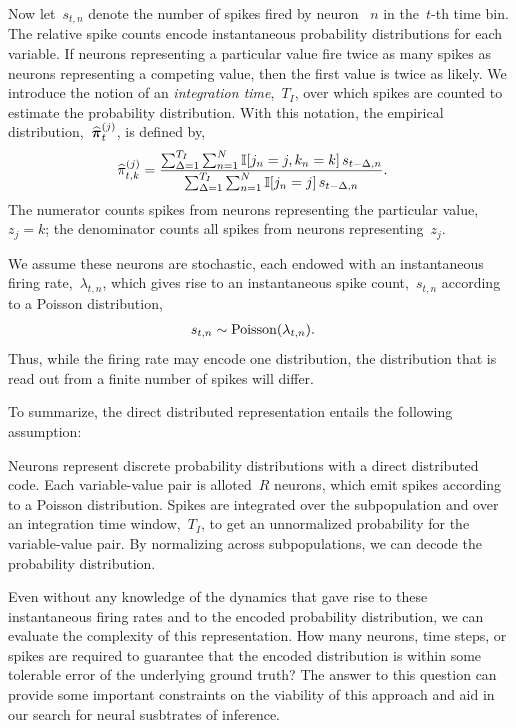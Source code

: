 Now let~$s_{t,n}$ denote the number of spikes fired by neuron ~$n$ in
the~$t$-th time bin. The relative spike counts encode instantaneous
probability distributions for each variable.  If neurons representing
a particular value fire twice as many spikes as neurons representing a
competing value, then the first value is twice as likely. We introduce
the notion of an \emph{integration time},~$T_I$, over which spikes are
counted to estimate the probability distribution. With this notation,
the empirical distribution,~$\widehat{\boldsymbol{\pi}}_t^{(j)}$, is defined by,
\begin{align}
  \widehat{\pi}_{t,k}^{(j)} &=
  \frac{\sum_{\Delta = 1}^{T_I} \sum_{n=1}^N \mathbb{I}[j_n=j, k_n=k] \, s_{t-\Delta,n}}
       {\sum_{\Delta = 1}^{T_I} \sum_{n=1}^N \mathbb{I}[j_n=j] \, s_{t-\Delta,n}}.
\end{align}
The numerator counts spikes from neurons representing the particular value,~$z_j=k$;
the denominator counts all spikes from neurons representing~$z_j$.


We assume these neurons are stochastic, each endowed
with an instantaneous firing rate,~$\lambda_{t,n}$, which gives rise to an
instantaneous spike count,~$s_{t,n}$ according to a Poisson distribution,
\begin{align}
s_{t,n} &\sim \mathrm{Poisson}(\lambda_{t,n}).
\end{align}
Thus, while the firing rate may encode one distribution, the distribution
that is read out from a finite number of spikes will differ. 

To summarize, the direct distributed representation entails the following
assumption:

\begin{assumption}
  Neurons represent discrete probability distributions with a direct
  distributed code. Each variable-value pair is alloted~$R$ neurons,
  which emit spikes according to a Poisson distribution.
  Spikes are integrated over the subpopulation and over an integration
  time window,~$T_I$, to get an unnormalized probability for the
  variable-value pair. By normalizing across subpopulations, we can decode
  the probability distribution. 
\end{assumption}

Even without any knowledge of the dynamics that gave rise
to these instantaneous firing rates and to the
encoded probability distribution, we can evaluate the complexity
of this representation. How many neurons, time steps, or spikes
are required to guarantee that the encoded distribution is within
some tolerable error of the underlying ground truth? The answer
to this question can provide some important constraints on the
viability of this approach and aid in our search for neural
susbtrates of inference. 

